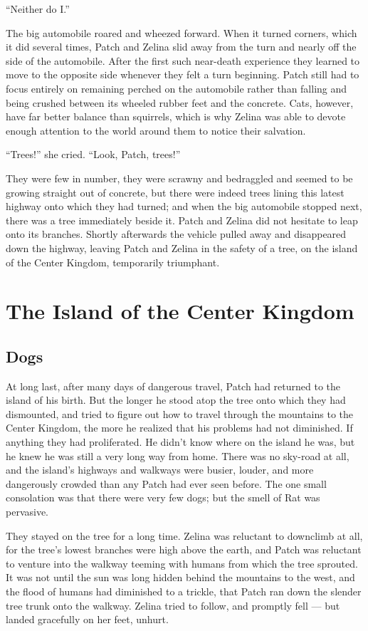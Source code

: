 \documentclass[ebook,oneside,openany,17pt]{memoir}
\renewcommand{\thechapter}{\Roman{chapter}}
\newcounter{sections}
\newcommand{\sections}[1]{%
  \section*{#1}
  \addtocounter{sections}{1}%
  \pdfbookmark[1]{#1}{section.\thechapter.\thesections}}
\begin{document}
“Neither do I.”

The big automobile roared and wheezed forward. When it turned corners,
which it did several times, Patch and Zelina slid away from the turn
and nearly off the side of the automobile. After the first such
near-death experience they learned to move to the opposite side
whenever they felt a turn beginning. Patch still had to focus entirely
on remaining perched on the automobile rather than falling and being
crushed between its wheeled rubber feet and the concrete. Cats,
however, have far better balance than squirrels, which is why Zelina
was able to devote enough attention to the world around them to notice
their salvation.

“Trees!” she cried. “Look, Patch, trees!”

They were few in number, they were scrawny and bedraggled and seemed
to be growing straight out of concrete, but there were indeed trees
lining this latest highway onto which they had turned; and when the
big automobile stopped next, there was a tree immediately beside
it. Patch and Zelina did not hesitate to leap onto its
branches. Shortly afterwards the vehicle pulled away and disappeared
down the highway, leaving Patch and Zelina in the safety of a tree, on
the island of the Center Kingdom, temporarily triumphant.


\chapter{The Island of the Center Kingdom}

\sections{Dogs}

At long last, after many days of dangerous travel, Patch had returned
to the island of his birth. But the longer he stood atop the tree onto
which they had dismounted, and tried to figure out how to travel
through the mountains to the Center Kingdom, the more he realized that
his problems had not diminished. If anything they had proliferated. He
didn’t know where on the island he was, but he knew he was still a
very long way from home. There was no sky-road at all, and the
island’s highways and walkways were busier, louder, and more
dangerously crowded than any Patch had ever seen before. The one small
consolation was that there were very few dogs; but the smell of Rat
was pervasive.

They stayed on the tree for a long time. Zelina was reluctant to
downclimb at all, for the tree’s lowest branches were high above the
earth, and Patch was reluctant to venture into the walkway teeming
with humans from which the tree sprouted. It was not until the sun was
long hidden behind the mountains to the west, and the flood of humans
had diminished to a trickle, that Patch ran down the slender tree
trunk onto the walkway. Zelina tried to follow, and promptly fell —
but landed gracefully on her feet, unhurt.
\end{document}
